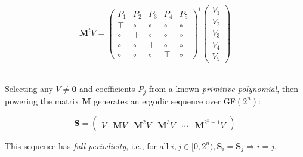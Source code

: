 \documentclass[portrait,a0b,final,a4resizeable]{a0poster}
\def\jointspacing{\vspace{0.3in}}
\begin{document}
\begin{poster}
\begin{multicols}{2}
      \[
        \mathbf{M}^tV = \begin{pmatrix}
                          P_1 & P_2 & P_3 & P_4 & P_5 \\
                          \top & \circ & \circ & \circ & \circ \\
                          \circ & \top & \circ & \circ & \circ \\
                          \circ & \circ & \top & \circ & \circ \\
                          \circ & \circ & \circ & \top & \circ
        \end{pmatrix}^t
        \begin{pmatrix}
          V_1 \\
          V_2 \\
          V_3 \\
          V_4 \\
          V_5
        \end{pmatrix}
      \]\\

      \hspace*{2cm}\begin{minipage}[c]{0.90\columnwidth}
      Selecting any $V \neq \mathbf{0}$ and coefficients $P_j$ from a known \textit{primitive polynomial}, then powering the matrix $\mathbf{M}$ generates an ergodic sequence over GF$(2^n)$:
      \end{minipage}

      \[
        \mathbf{S} = \begin{pmatrix}V & \mathbf{M}V & \mathbf{M}^{2}V & \mathbf{M}^{3}V & \cdots & \mathbf{M}^{2^n-1}V \end{pmatrix}
      \]

      \hspace*{2cm}\begin{minipage}[c]{0.90\columnwidth}
      This sequence has \textit{full periodicity}, i.e., for all $i, j \in [0, 2^n), \mathbf{S}_i = \mathbf{S}_j \Rightarrow i = j$.
      \end{minipage}

      \jointspacing



\end{multicols}
\end{poster}
\end{document}

